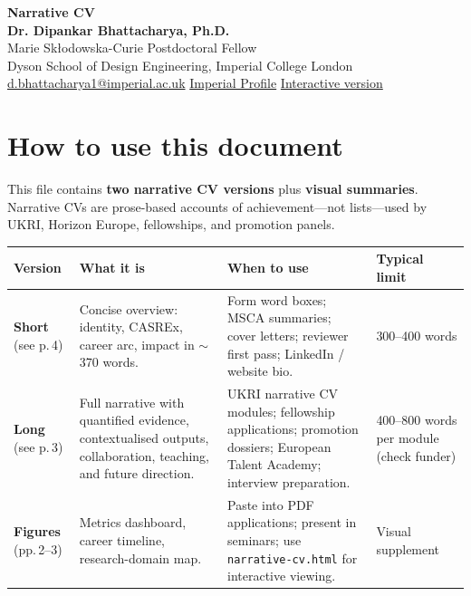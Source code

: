 \documentclass[11pt,a4paper]{article}
\begin{document}
\thispagestyle{empty}
\begin{center}
  {\Huge\bfseries\sffamily\color{accent} Narrative CV}\\[0.3em]
  {\large\bfseries Dr. Dipankar Bhattacharya, Ph.D.}\\[0.15em]
  {\normalsize Marie Sk\l{}odowska-Curie Postdoctoral Fellow}\\[0.08em]
  {\normalsize Dyson School of Design Engineering, Imperial College London}\\[0.12em]
  {\small \href{mailto:d.bhattacharya1@imperial.ac.uk}{d.bhattacharya1@imperial.ac.uk}
  \textbar{} \href{https://profiles.imperial.ac.uk/d.bhattacharya1/about}{Imperial Profile}
  \textbar{} \href{https://bhattner143.github.io/dips/narrative-cv.html}{Interactive version}}
\end{center}

\section*{How to use this document}

This file contains \textbf{two narrative CV versions} plus \textbf{visual summaries}. Narrative CVs are prose-based accounts of achievement---not lists---used by UKRI, Horizon Europe, fellowships, and promotion panels.

\begin{center}
\renewcommand{\arraystretch}{1.35}
\begin{tabular}{@{}p{2.4cm}p{4.8cm}p{4.8cm}p{3.2cm}@{}}
\toprule
\textbf{\sffamily Version} & \textbf{\sffamily What it is} & \textbf{\sffamily When to use} & \textbf{\sffamily Typical limit} \\
\midrule
\textbf{Short} (see p.\,4) &
Concise overview: identity, CASREx, career arc, impact in $\sim$370 words. &
Form word boxes; MSCA summaries; cover letters; reviewer first pass; LinkedIn / website bio. &
300--400 words \\
\addlinespace
\textbf{Long} (see p.\,3) &
Full narrative with quantified evidence, contextualised outputs, collaboration, teaching, and future direction. &
UKRI narrative CV modules; fellowship applications; promotion dossiers; European Talent Academy; interview preparation. &
400--800 words per module (check funder) \\
\addlinespace
\textbf{Figures} (pp.\,2--3) &
Metrics dashboard, career timeline, research-domain map. &
Paste into PDF applications; present in seminars; use \texttt{narrative-cv.html} for interactive viewing. &
Visual supplement \\
\bottomrule
\end{tabular}
\end{center}
\end{document}
